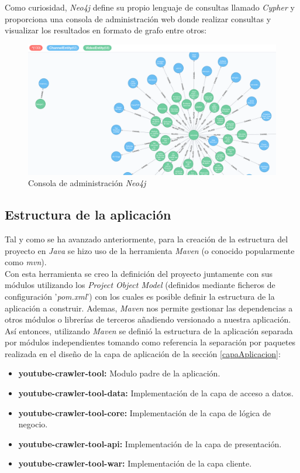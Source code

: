 \documentclass[11pt,a4paper]{article}
\begin{document}
Como curiosidad, \textit{Neo4j} define su propio lenguaje de consultas llamado \textit{Cypher} y proporciona una consola de administración web donde realizar consultas y visualizar los resultados en formato de grafo entre otros:

\begin{figure}[H]
\centering
\includegraphics[scale=0.20]{desarrollo/neo4j.png}
\caption{Consola de administración \textit{Neo4j}}
\end{figure}

\medskip 

\subsection{Estructura de la aplicación}
Tal y como se ha avanzado anteriormente, para la creación de la estructura del proyecto en \textit{Java} se hizo uso de la herramienta \textit{Maven} (o conocido popularmente como \textit{mvn}).
\\

Con esta herramienta se creo la definición del proyecto juntamente con sus módulos utilizando los \textit{Project Object Model} (definidos mediante ficheros de configuración '\textit{pom.xml}') con los cuales es posible definir la estructura de la aplicación a construir. Ademas, \textit{Maven} nos permite gestionar las dependencias a otros módulos o librerías de terceros añadiendo versionado a nuestra aplicación.
\\

Así entonces, utilizando \textit{Maven} se definió la estructura de la aplicación separada por módulos independientes tomando como referencia la separación por paquetes realizada en el diseño de la capa de aplicación de la sección \ref{capaAplicacion}:
\pagebreak 

\begin{itemize}
\item \textbf{youtube-crawler-tool:} Modulo padre de la aplicación.
\item \textbf{youtube-crawler-tool-data:} Implementación de la capa de acceso a datos.
\item \textbf{youtube-crawler-tool-core:} Implementación de la capa de lógica de negocio.
\item \textbf{youtube-crawler-tool-api:} Implementación de la capa de presentación.
\item \textbf{youtube-crawler-tool-war:} Implementación de la capa cliente.
\end{itemize}
\end{document}
